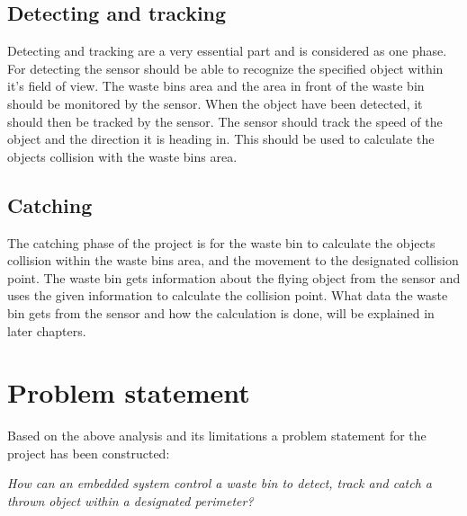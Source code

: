 \subsection{Detecting and tracking}
\label{sec:Detecting and trackingAnalysis}
Detecting and tracking are a very essential part and is considered as one phase. For detecting the sensor should be able to recognize the specified object within it's field of view. The waste bins area and the area in front of the waste bin should be monitored by the sensor. \newline When the object have been detected, it should then be tracked by the sensor. The sensor should track the speed of the object and the direction it is heading in. This should be used to calculate the objects collision with the waste bins area.

\subsection{Catching}
\label{sec:CatchingAnalysis}
The catching phase of the project is for the waste bin to calculate the objects collision within the waste bins area, and the movement to the designated collision point. The waste bin gets information about the flying object from the sensor and uses the given information to calculate the collision point. What data the waste bin gets from the sensor and how the calculation is done, will be explained in later chapters. 

\section{Problem statement}
\label{sec:Problem statement}
Based on the above analysis and its limitations a problem statement for the project has been constructed:

\textit{How can an embedded system control a waste bin to detect, track and catch a thrown object within a designated perimeter?}